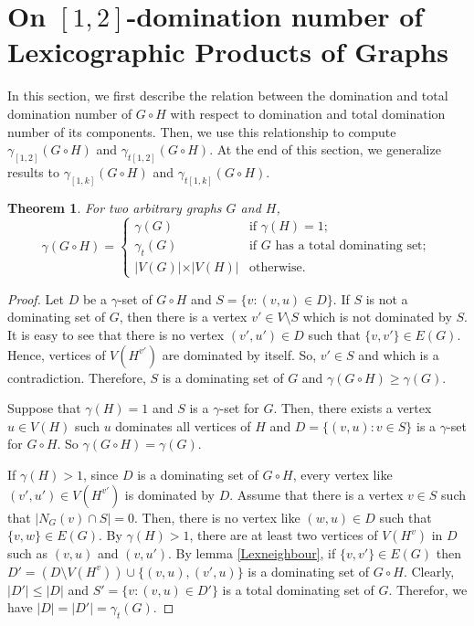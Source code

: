 \documentclass[A4,12pt]{article}
\newtheorem{theorem}{Theorem}[section]
\theoremstyle{definition}
\theoremstyle{remark}
\begin{document}
\section{On $[1,2]$-domination number of Lexicographic Products of Graphs} \label{lexproductno}
In this section, we first describe the relation between  the domination and total domination number of  $G \circ H$ with respect to domination and total domination number of its components. Then, we use this relationship to compute $\gamma_{[1,2]}(G\circ H)$ and $\gamma_{t[1,2]}(G\circ H)$. At the end of this section, we generalize results to $\gamma_{[1,k]}(G\circ H)$ and $\gamma_{t[1,k]}(G\circ H)$.
\begin{theorem} \label{lexthem}
	For two arbitrary graphs  $G$ and $H$,
\begin{equation*}
\gamma(G \circ H)= \left\{
\begin{array}{ll}
 \gamma(G) & \text{if } \gamma(H)=1;\\
 \gamma_t(G) & \text{if } G \text{ has a total dominating set};\\
\vert V(G)\vert \times \vert V(H) \vert & \text{otherwise}.
\end{array} \right.
\end{equation*}
\end{theorem}
\begin{proof}

Let $D$ be a $\gamma$-set of $G\circ H$ and $S=\{v:(v,u)\in D\}$.
If $S$ is not a dominating set of $G$, then there is a vertex $v' \in V  \setminus  S$  which is not dominated by $S$.
It is easy to see that there is no vertex $(v',u')\in D$ such that $\{v,v'\}\in E(G)$.  Hence, vertices of $V(H^{v'})$ are dominated by itself. So,  $v' \in S$ and which is a contradiction.
Therefore, $S$ is a dominating set of $G$ and  $\gamma(G\circ H) \geq  \gamma(G)$.

Suppose that $\gamma(H)=1$ and $S$ is a $\gamma$-set for $G$.  Then, there exists a vertex $u \in V(H)$ such $u$ dominates all vertices of $H$ and $D=\{(v,u):v\in S\}$  is a $\gamma$-set for $G\circ H$.   So  $\gamma(G\circ H) =  \gamma(G)$.

If $\gamma(H)>1$, since $D$ is a dominating set of $G \circ H$, every vertex like $(v',u')\in V(H^{v'})$ is dominated by $D$. Assume that there is a vertex $v \in S$ such that $ \vert N_G(v) \cap S \vert=0$. Then, there is no vertex like $(w,u)\in D$ such that $\{v,w\}\in E(G)$. By  $\gamma (H)>1$, there are at least two vertices of $V(H^v)$ in $D$ such as $(v,u)$ and $(v,u')$.  By lemma \ref{Lexneighbour}, if $\{v,v'\}\in E(G)$ then $D'=(D\setminus V(H^v))\cup\{(v,u),(v',u)\}$ is a dominating set of $G\circ H$.  Clearly, $\vert D' \vert \leq \vert D \vert$  and $S'=\{v:(v,u)\in D'\}$ is a total dominating set of $G$. Therefor, we have $\vert  D \vert=\vert D' \vert=\gamma_t(G)$.
\end{proof}
\end{document}
